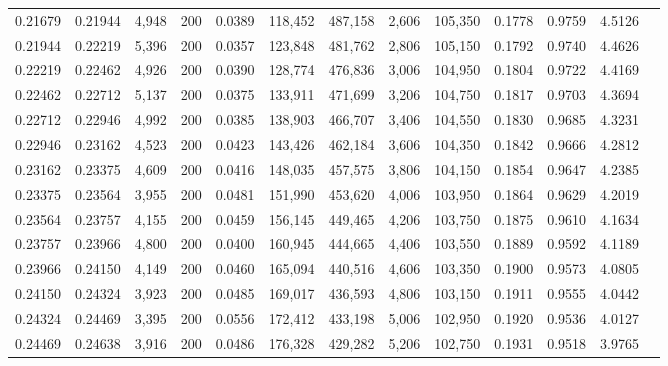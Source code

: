\begin{tabular}{rrrrrrrrrrrrr}
0.21679 & 0.21944 &  4,948 & 200 &                                     0.0389 & 118,452 & 487,158 &   2,606 & 105,350 & 0.1778 & 0.9759 & 4.5126 \\
0.21944 & 0.22219 &  5,396 & 200 &                                     0.0357 & 123,848 & 481,762 &   2,806 & 105,150 & 0.1792 & 0.9740 & 4.4626 \\
0.22219 & 0.22462 &  4,926 & 200 &                                     0.0390 & 128,774 & 476,836 &   3,006 & 104,950 & 0.1804 & 0.9722 & 4.4169 \\
0.22462 & 0.22712 &  5,137 & 200 &                                     0.0375 & 133,911 & 471,699 &   3,206 & 104,750 & 0.1817 & 0.9703 & 4.3694 \\
0.22712 & 0.22946 &  4,992 & 200 &                                     0.0385 & 138,903 & 466,707 &   3,406 & 104,550 & 0.1830 & 0.9685 & 4.3231 \\
0.22946 & 0.23162 &  4,523 & 200 &                                     0.0423 & 143,426 & 462,184 &   3,606 & 104,350 & 0.1842 & 0.9666 & 4.2812 \\
0.23162 & 0.23375 &  4,609 & 200 &                                     0.0416 & 148,035 & 457,575 &   3,806 & 104,150 & 0.1854 & 0.9647 & 4.2385 \\
0.23375 & 0.23564 &  3,955 & 200 &                                     0.0481 & 151,990 & 453,620 &   4,006 & 103,950 & 0.1864 & 0.9629 & 4.2019 \\
0.23564 & 0.23757 &  4,155 & 200 &                                     0.0459 & 156,145 & 449,465 &   4,206 & 103,750 & 0.1875 & 0.9610 & 4.1634 \\
0.23757 & 0.23966 &  4,800 & 200 &                                     0.0400 & 160,945 & 444,665 &   4,406 & 103,550 & 0.1889 & 0.9592 & 4.1189 \\
0.23966 & 0.24150 &  4,149 & 200 &                                     0.0460 & 165,094 & 440,516 &   4,606 & 103,350 & 0.1900 & 0.9573 & 4.0805 \\
0.24150 & 0.24324 &  3,923 & 200 &                                     0.0485 & 169,017 & 436,593 &   4,806 & 103,150 & 0.1911 & 0.9555 & 4.0442 \\
0.24324 & 0.24469 &  3,395 & 200 &                                     0.0556 & 172,412 & 433,198 &   5,006 & 102,950 & 0.1920 & 0.9536 & 4.0127 \\
0.24469 & 0.24638 &  3,916 & 200 &                                     0.0486 & 176,328 & 429,282 &   5,206 & 102,750 & 0.1931 & 0.9518 & 3.9765 \\

\end{tabular}
